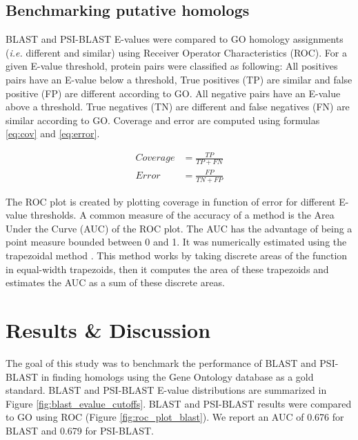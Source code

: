 \documentclass{article}
\begin{document}
\subsection{Benchmarking putative homologs}

BLAST and PSI-BLAST E-values were compared to GO homology assignments (\textit{i.e.} different and similar) using Receiver Operator Characteristics (ROC). For a given E-value threshold, protein pairs were classified as following: All positives pairs have an E-value below a threshold, True positives (TP) are similar and false positive (FP) are different according to GO. All negative pairs have an E-value above a threshold. True negatives (TN) are different and false negatives (FN) are similar according to GO. Coverage and error are computed using formulas \eqref{eq:cov} and \eqref{eq:error}.

\begin{subequations}
\begin{align}
Coverage &= \frac{TP}{TP + FN} \label{eq:cov} \\
Error &= \frac{FP}{TN + FP} \label{eq:error}
\end{align}
\end{subequations}

The ROC plot is created by plotting coverage in function of error for different E-value thresholds. A common measure of the accuracy of a method is the Area Under the Curve (AUC) of the ROC plot. The AUC has the advantage of being a point measure bounded between 0 and 1. It was numerically estimated using the trapezoidal method \citep{kaw_numerical_2011}. This method works by taking discrete areas of the function in equal-width trapezoids, then it computes the area of these trapezoids and estimates the AUC as a sum of these discrete areas.

\newpage
\section{Results \& Discussion}

The goal of this study was to benchmark the performance of BLAST and PSI-BLAST in finding homologs using the Gene Ontology database as a gold standard. BLAST and PSI-BLAST E-value distributions are summarized in Figure \ref{fig:blast_evalue_cutoffs}. BLAST and PSI-BLAST results were compared to GO using ROC (Figure \ref{fig:roc_plot_blast}). We report an AUC of 0.676 for BLAST and 0.679 for PSI-BLAST.
\end{document}
